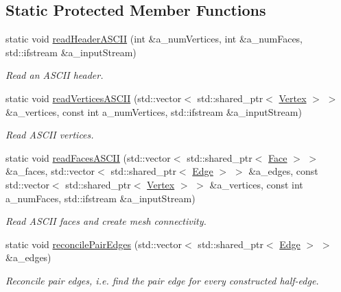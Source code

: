 \subsection*{Static Protected Member Functions}
\begin{DoxyCompactItemize}
\item 
static void \hyperlink{classDcel_1_1Parser_1_1PLY_aa8741e334f6c350e1269a42ee1022e57}{read\+Header\+A\+S\+C\+II} (int \&a\+\_\+num\+Vertices, int \&a\+\_\+num\+Faces, std\+::ifstream \&a\+\_\+input\+Stream)
\begin{DoxyCompactList}\small\item\em Read an A\+S\+C\+II header. \end{DoxyCompactList}\item 
static void \hyperlink{classDcel_1_1Parser_1_1PLY_a755c28a17a836a05af31991a87212df0}{read\+Vertices\+A\+S\+C\+II} (std\+::vector$<$ std\+::shared\+\_\+ptr$<$ \hyperlink{classDcel_1_1Parser_1_1PLY_acbecc13804a702a6bf2687d9bf5d7989}{Vertex} $>$ $>$ \&a\+\_\+vertices, const int a\+\_\+num\+Vertices, std\+::ifstream \&a\+\_\+input\+Stream)
\begin{DoxyCompactList}\small\item\em Read A\+S\+C\+II vertices. \end{DoxyCompactList}\item 
static void \hyperlink{classDcel_1_1Parser_1_1PLY_ae54284d1c7c18a584bd14678763a58e7}{read\+Faces\+A\+S\+C\+II} (std\+::vector$<$ std\+::shared\+\_\+ptr$<$ \hyperlink{classDcel_1_1Parser_1_1PLY_ac67854dee5613f4e877e8caddb4580f3}{Face} $>$ $>$ \&a\+\_\+faces, std\+::vector$<$ std\+::shared\+\_\+ptr$<$ \hyperlink{classDcel_1_1Parser_1_1PLY_af3741c96a8a8434780665641912ff1d4}{Edge} $>$ $>$ \&a\+\_\+edges, const std\+::vector$<$ std\+::shared\+\_\+ptr$<$ \hyperlink{classDcel_1_1Parser_1_1PLY_acbecc13804a702a6bf2687d9bf5d7989}{Vertex} $>$ $>$ \&a\+\_\+vertices, const int a\+\_\+num\+Faces, std\+::ifstream \&a\+\_\+input\+Stream)
\begin{DoxyCompactList}\small\item\em Read A\+S\+C\+II faces and create mesh connectivity. \end{DoxyCompactList}\item 
static void \hyperlink{classDcel_1_1Parser_1_1PLY_afaceb1664b12f30599fe68faba6ca725}{reconcile\+Pair\+Edges} (std\+::vector$<$ std\+::shared\+\_\+ptr$<$ \hyperlink{classDcel_1_1Parser_1_1PLY_af3741c96a8a8434780665641912ff1d4}{Edge} $>$ $>$ \&a\+\_\+edges)
\begin{DoxyCompactList}\small\item\em Reconcile pair edges, i.\+e. find the pair edge for every constructed half-\/edge. \end{DoxyCompactList}\end{DoxyCompactItemize}


